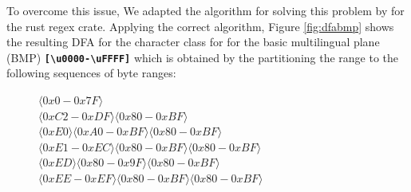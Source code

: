 To overcome this issue, We adapted the algorithm for solving this problem by \citet{utf8-ranges} for the rust regex crate.
Applying the correct algorithm, Figure \ref{fig:dfabmp} shows the resulting DFA for the character class for for the basic multilingual plane (BMP) \texttt{\textbf{[\textbackslash u{0000}-\textbackslash u{FFFF}]}} which is obtained by the partitioning the range to the following sequences of byte ranges:

\begin{figure}[H]
\centering
$\langle0x0-0x7F\rangle$\\
$\langle0xC2-0xDF\rangle \langle0x80-0xBF\rangle$\\
$\langle0xE0\rangle \langle0xA0-0xBF\rangle \langle0x80-0xBF\rangle$\\
$\langle0xE1-0xEC\rangle \langle0x80-0xBF\rangle \langle0x80-0xBF\rangle$\\
$\langle0xED\rangle \langle0x80-0x9F\rangle \langle0x80-0xBF\rangle$\\
$\langle0xEE-0xEF\rangle \langle0x80-0xBF\rangle \langle0x80-0xBF\rangle$
\end{figure}

